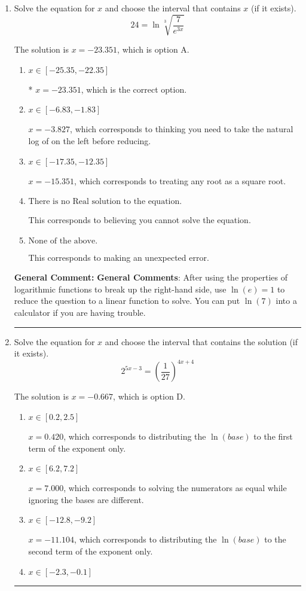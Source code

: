 \documentclass{extbook}[14pt]
\newcommand{\litem}[1]{\item #1

\rule{\textwidth}{0.4pt}}
\begin{document}
\begin{enumerate}\litem{
 Solve the equation for $x$ and choose the interval that contains $x$ (if it exists).
\[  24 = \ln{\sqrt[3]{\frac{7}{e^{3x}}}} \]

The solution is \( x = -23.351 \), which is option A.\begin{enumerate}[label=\Alph*.]
\item \( x \in [-25.35, -22.35] \)

* $x = -23.351$, which is the correct option.
\item \( x \in [-6.83, -1.83] \)

$x = -3.827$, which corresponds to thinking you need to take the natural log of on the left before reducing.
\item \( x \in [-17.35, -12.35] \)

$x = -15.351$, which corresponds to treating any root as a square root.
\item \( \text{There is no Real solution to the equation.} \)

This corresponds to believing you cannot solve the equation.
\item \( \text{None of the above.} \)

This corresponds to making an unexpected error.
\end{enumerate}

\textbf{General Comment:} \textbf{General Comments}: After using the properties of logarithmic functions to break up the right-hand side, use $\ln(e) = 1$ to reduce the question to a linear function to solve. You can put $\ln(7)$ into a calculator if you are having trouble.
}
\litem{
Solve the equation for $x$ and choose the interval that contains the solution (if it exists).
\[ 2^{5x-3} = \left(\frac{1}{27}\right)^{4x+4} \]

The solution is \( x = -0.667 \), which is option D.\begin{enumerate}[label=\Alph*.]
\item \( x \in [0.2, 2.5] \)

$x = 0.420$, which corresponds to distributing the $\ln(base)$ to the first term of the exponent only.
\item \( x \in [6.2, 7.2] \)

$x = 7.000$, which corresponds to solving the numerators as equal while ignoring the bases are different.
\item \( x \in [-12.8, -9.2] \)

$x = -11.104$, which corresponds to distributing the $\ln(base)$ to the second term of the exponent only.
\item \( x \in [-2.3, -0.1] \)


\end{enumerate}}
\end{enumerate}
\end{document}
